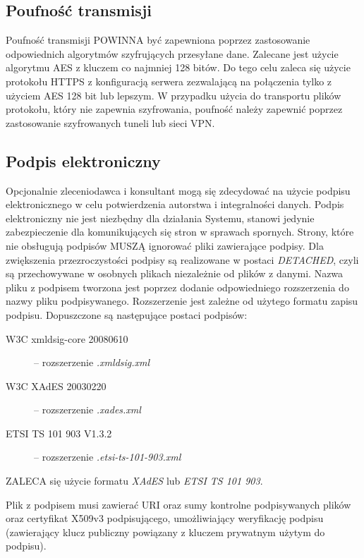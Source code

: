 \documentclass[a4paper]{article}
\begin{document}
\subsection{Poufność transmisji}

Poufność transmisji POWINNA być zapewniona poprzez zastosowanie odpowiednich algorytmów
szyfrujących przesyłane dane. Zalecane jest użycie algorytmu AES z kluczem co najmniej 128
bitów. Do tego celu zaleca się użycie protokołu HTTPS z konfiguracją serwera zezwalającą
na połączenia tylko z użyciem AES 128 bit lub lepszym. W przypadku użycia do transportu
plików protokołu, który nie zapewnia szyfrowania, poufność należy zapewnić poprzez
zastosowanie szyfrowanych tuneli lub sieci VPN.

\subsection{Podpis elektroniczny}
\label{sec:sig}

Opcjonalnie zleceniodawca i konsultant mogą się zdecydować na użycie podpisu
elektronicznego w celu potwierdzenia autorstwa i integralności danych. Podpis elektroniczny
nie jest niezbędny dla działania Systemu, stanowi jedynie zabezpieczenie dla komunikujących
się stron w sprawach spornych. Strony, które nie obsługują podpisów MUSZĄ ignorować pliki
zawierające podpisy. Dla zwiększenia przezroczystości podpisy są realizowane w postaci
\emph{DETACHED}, czyli są przechowywane w osobnych plikach niezależnie od plików z danymi.
Nazwa pliku z podpisem tworzona jest poprzez dodanie odpowiedniego rozszerzenia do nazwy
pliku podpisywanego. Rozszerzenie jest zależne od użytego formatu zapisu podpisu.
Dopuszczone są następujące postaci podpisów:
\begin{description}
  \item[W3C xmldsig-core 20080610] -- rozszerzenie \textit{.xmldsig.xml}
  \item[W3C XAdES 20030220] -- rozszerzenie \textit{.xades.xml}
  \item[ETSI TS 101 903 V1.3.2] -- rozszerzenie \textit{.etsi-ts-101-903.xml}
\end{description}

ZALECA się użycie formatu \textit{XAdES} lub \textit{ETSI TS 101 903}.

Plik z podpisem musi zawierać URI oraz sumy kontrolne podpisywanych plików oraz certyfikat
X509v3 podpisującego, umożliwiający weryfikację podpisu (zawierający klucz publiczny
powiązany z kluczem prywatnym użytym do podpisu).
\end{document}
